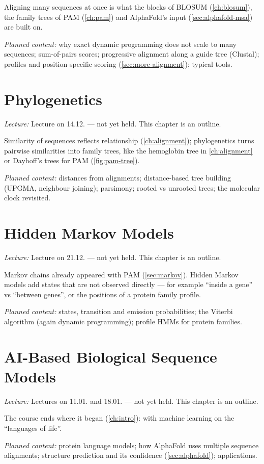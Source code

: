 \documentclass[11pt, oneside]{book}
\newcommand{\lectureref}[1]{%
  \par{\small\color{gray!70!black}\textit{Lecture:} #1}\par}
\newcommand{\planned}[1]{%
  \par{\small\color{gray!70!black}\textit{Planned content:} #1}\par}
\begin{document}
Aligning many sequences at once is what the blocks of BLOSUM
(\cref{ch:blosum}), the family trees of PAM (\cref{ch:pam}) and AlphaFold's
input (\cref{sec:alphafold-msa}) are built on.

\planned{why exact dynamic programming does not scale to many sequences;
sum-of-pairs scores; progressive alignment along a guide tree (Clustal);
profiles and position-specific scoring (\cref{sec:more-alignment}); typical
tools.}

\chapter{Phylogenetics}
\label{ch:phylo}

\lectureref{Lecture on 14.12. --- not yet held. This chapter is an outline.}

Similarity of sequences reflects relationship (\cref{ch:alignment}); phylogenetics
turns pairwise similarities into family trees, like the hemoglobin tree in
\cref{ch:alignment} or Dayhoff's trees for PAM (\cref{fig:pam-tree}).

\planned{distances from alignments; distance-based tree building (UPGMA,
neighbour joining); parsimony; rooted vs unrooted trees; the molecular clock
revisited.}

\chapter{Hidden Markov Models}
\label{ch:hmm}

\lectureref{Lecture on 21.12. --- not yet held. This chapter is an outline.}

Markov chains already appeared with PAM (\cref{sec:markov}). Hidden Markov
models add states that are not observed directly --- for example ``inside a
gene'' vs ``between genes'', or the positions of a protein family profile.

\planned{states, transition and emission probabilities; the Viterbi algorithm
(again dynamic programming); profile HMMs for protein families.}

\chapter{AI-Based Biological Sequence Models}
\label{ch:ai}

\lectureref{Lectures on 11.01. and 18.01. --- not yet held. This chapter is an
outline.}

The course ends where it began (\cref{ch:intro}): with machine learning on
the ``languages of life''.

\planned{protein language models; how AlphaFold uses multiple sequence
alignments; structure prediction and its confidence (\cref{sec:alphafold});
applications.}
\end{document}
